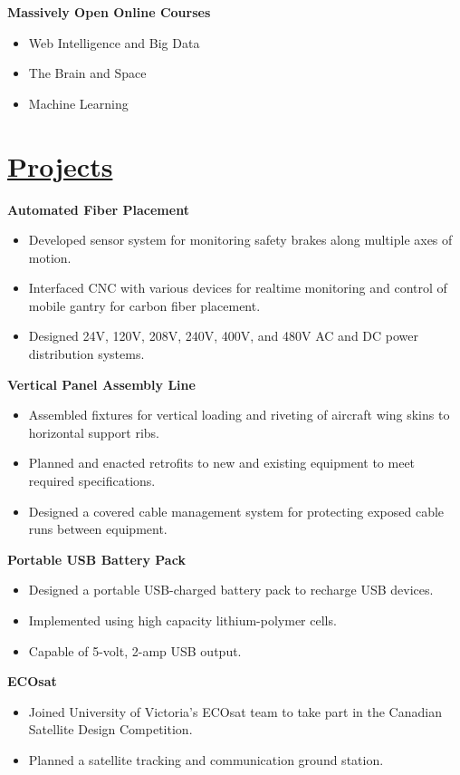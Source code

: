 \documentclass[a4paper, 11pt]{article}
\begin{document}
  \textbf{Massively Open Online Courses}
  \begin{itemize}[nosep]
    \item Web Intelligence and Big Data
    \item The Brain and Space
    \item Machine Learning
  \end{itemize}
  
\section{\underline{Projects}}
  \textbf{Automated Fiber Placement}
  \begin{itemize}[nosep]
    \item Developed sensor system for monitoring safety brakes along multiple axes of motion.
    \item Interfaced CNC with various devices for realtime monitoring and control of mobile gantry for carbon fiber placement.
    \item Designed 24V, 120V, 208V, 240V, 400V, and 480V AC and DC power distribution systems.
  \end{itemize}
  \medskip

  \textbf{Vertical Panel Assembly Line}
  \begin{itemize}[nosep]
    \item Assembled fixtures for vertical loading and riveting of aircraft wing skins to horizontal support ribs.
    \item Planned and enacted retrofits to new and existing equipment to meet required specifications.
    \item Designed a covered cable management system for protecting exposed cable runs between equipment.
  \end{itemize}
  \medskip

  \textbf{Portable USB Battery Pack}
  \begin{itemize}[nosep]
    \item Designed a portable USB-charged battery pack to recharge USB devices.
    \item Implemented using high capacity lithium-polymer cells.
    \item Capable of 5-volt, 2-amp USB output.
  \end{itemize}
  \medskip
  
  \textbf{ECOsat}
  \begin{itemize}[nosep]
    \item Joined University of Victoria's ECOsat team to take part in the Canadian Satellite Design Competition.
    \item Planned a satellite tracking and communication ground station.
  \end{itemize}
  
\end{document}
